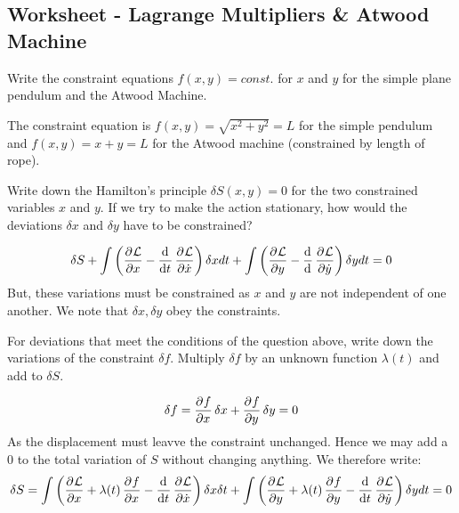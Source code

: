 \subsection{Worksheet - Lagrange Multipliers \& Atwood Machine}
\begin{p}
Write the constraint equations $f(x,y) = const.$ for $x$ and $y$ for the simple plane pendulum and the Atwood Machine.
\end{p}
\begin{s}
The constraint equation is $f(x, y) = \sqrt{x^2 + y^2} = L$ for the simple pendulum and $f(x, y) = x + y = L$ for the Atwood machine (constrained by length of rope).
\end{s}

\begin{p}
Write down the Hamilton's principle $\delta S(x,y) = 0$ for the two constrained variables $x$ and $y$. If we try to make the action stationary, how would the deviations $\delta x$ and $\delta y$ have to be constrained?
\end{p}
\begin{s}
\begin{align*}
    \delta S + \int\left(\dpd{\LL}{x} - \dod{}{t}\dpd{\LL}{\dot{x}}\right)\delta x dt + \int \left(\dpd{\LL}{y} - \dod{}{}\dpd{\LL}{\dot{y}}\right)\delta y dt = 0
\end{align*}
But, these variations must be constrained as $x$ and $y$ are not independent of one another. We note that $\delta x, \delta y$ obey the constraints.
\end{s}

\begin{p}
For deviations that meet the conditions of the question above, write down the variations of the constraint $\delta f$. Multiply $\delta f$ by an unknown function $\lambda(t)$ and add to $\delta S$.
\end{p}
\begin{s}
\[\delta f = \dpd{f}{x}\delta x + \dpd{f}{y}\delta y = 0\]
As the displacement must leavve the constraint unchanged. Hence we may add a $0$ to the total variation of $S$ without changing anything. We therefore write:
\[\delta S = \int \left(\dpd{\LL}{x} + \lambda(t)\dpd{f}{x} - \dod{}{t}\dpd{\LL}{\dot{x}}\right)\delta x \delta t + \int\left(\dpd{\LL}{y} + \lambda(t)\dpd{f}{y} - \dod{}{t}\dpd{\LL}{\dot{y}}\right)\delta y dt = 0\]
\end{s}

